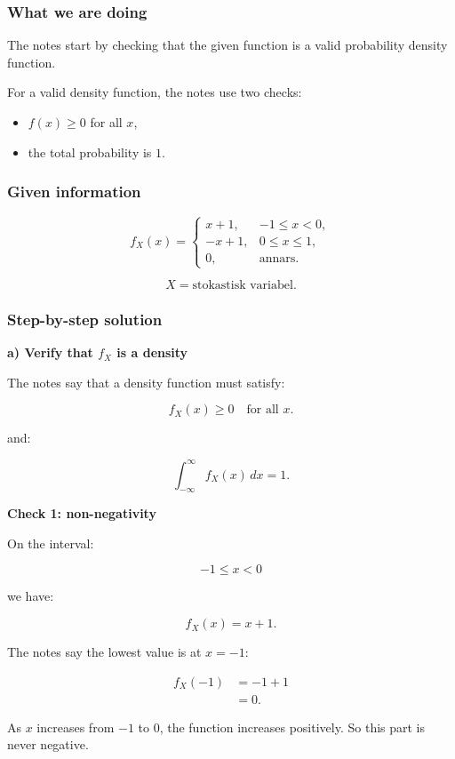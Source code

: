 \documentclass[10pt]{article}
\begin{document}
\subsubsection*{What we are doing}
The notes start by checking that the given function is
a valid probability density function.

For a valid density function, the notes use two checks:
\begin{itemize}
\item \(f(x)\ge 0\) for all \(x\),
\item the total probability is \(1\).
\end{itemize}

\subsubsection*{Given information}
\[
f_X(x)=
\begin{cases}
x+1, & -1\le x<0,\\
-x+1, & 0\le x\le 1,\\
0, & \text{annars}.
\end{cases}
\]

\[
X=\text{stokastisk variabel}.
\]

\subsubsection*{Step-by-step solution}

\textbf{a) Verify that \(f_X\) is a density}

The notes say that a density function must satisfy:

\[
f_X(x)\ge 0
\quad \text{for all }x.
\]

and:

\[
\int_{-\infty}^{\infty} f_X(x)\,dx=1.
\]

\textbf{Check 1: non-negativity}

On the interval:

\[
-1\le x<0
\]

we have:

\[
f_X(x)=x+1.
\]

The notes say the lowest value is at \(x=-1\):

\begin{align*}
f_X(-1)
&=-1+1 \\[2mm]
&=0.
\end{align*}

As \(x\) increases from \(-1\) to \(0\),
the function increases positively.
So this part is never negative.
\end{document}
